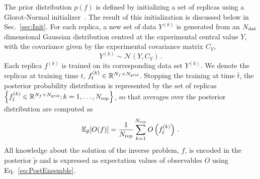 The prior distribution $p(f)$ is defined by initializing a set of replicas using a Glorot-Normal 
initializer~\cite{glorot2010understanding}.
The result of this initialization is discussed below in Sec.~\ref{sec:Init}.
For each replica, a new set of data $Y^{(k)}$ is generated from an $N_{\mathrm{dat}}$ dimensional Gaussian distribution
centred at the experimental central value $Y$, with the covariance given by the experimental covariance
matrix $C_Y$,
\begin{equation}
    \label{eq:ExpReplicaDistr}
    Y^{(k)} \sim \mathcal{N}\left(Y, C_Y\right)\, .
\end{equation}
Each replica $f^{(k)}$ is trained on its corresponding data set $Y^{(k)}$. We denote the replicas at training time $t$,
$f^{(k)}_{t} \in \mathbb{R}^{N_{f}\times N_{\mathrm{grid}}}$. Stopping the training at time $\bar{t}$, the posterior probability
distribution is represented by the set of replicas
$\left\{f^{(k)}_{\bar{t}}\in \mathbb{R}^{N_{f}\times N_{\mathrm{grid}}}; k=1, \ldots, N_{\rm rep}\right\}$, so that averages over the posterior
distribution are computed as
\begin{equation}
    \label{eq:PostEnsemble}
    \mathbb{E}_{\tilde{p}}[O(f)] = \frac{1}{N_{\rm rep}} \sum_{k=1}^{N_{\rm rep}}
        O\left(f^{(k)}_{\bar{t}}\right)\, .
\end{equation}
All knowledge about the solution of the inverse problem, $f$, is encoded in the posterior
$\tilde{p}$ and is expressed as expectation values of observables $O$ using
Eq.~\eqref{eq:PostEnsemble}.

\FloatBarrier
